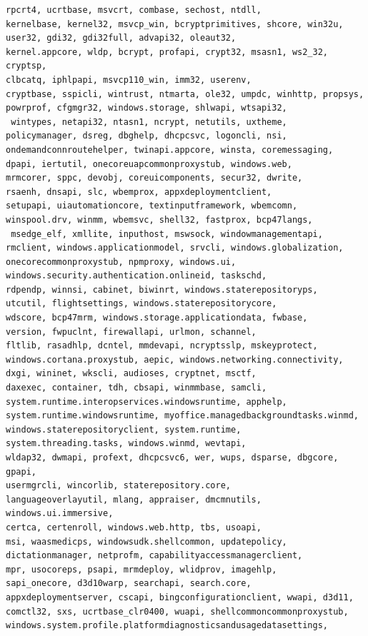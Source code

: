 \documentclass[a4paper,twoside,12pt]{book}
\begin{document}
\begin{appendices}
\begin{lstlisting}[label={lst:dlls},caption={All gathered DLL's},escapeinside=``,basicstyle=\tiny,breaklines=true]
rpcrt4, ucrtbase, msvcrt, combase, sechost, ntdll, 
kernelbase, kernel32, msvcp_win, bcryptprimitives, shcore, win32u, 
user32, gdi32, gdi32full, advapi32, oleaut32, 
kernel.appcore, wldp, bcrypt, profapi, crypt32, msasn1, ws2_32, cryptsp, 
clbcatq, iphlpapi, msvcp110_win, imm32, userenv, 
cryptbase, sspicli, wintrust, ntmarta, ole32, umpdc, winhttp, propsys, 
powrprof, cfgmgr32, windows.storage, shlwapi, wtsapi32,
 wintypes, netapi32, ntasn1, ncrypt, netutils, uxtheme, 
policymanager, dsreg, dbghelp, dhcpcsvc, logoncli, nsi, 
ondemandconnroutehelper, twinapi.appcore, winsta, coremessaging, 
dpapi, iertutil, onecoreuapcommonproxystub, windows.web, 
mrmcorer, sppc, devobj, coreuicomponents, secur32, dwrite, 
rsaenh, dnsapi, slc, wbemprox, appxdeploymentclient, 
setupapi, uiautomationcore, textinputframework, wbemcomn, 
winspool.drv, winmm, wbemsvc, shell32, fastprox, bcp47langs,
 msedge_elf, xmllite, inputhost, mswsock, windowmanagementapi, 
rmclient, windows.applicationmodel, srvcli, windows.globalization, 
onecorecommonproxystub, npmproxy, windows.ui, 
windows.security.authentication.onlineid, taskschd, 
rdpendp, winnsi, cabinet, biwinrt, windows.staterepositoryps, 
utcutil, flightsettings, windows.staterepositorycore, 
wdscore, bcp47mrm, windows.storage.applicationdata, fwbase, 
version, fwpuclnt, firewallapi, urlmon, schannel, 
fltlib, rasadhlp, dcntel, mmdevapi, ncryptsslp, mskeyprotect, 
windows.cortana.proxystub, aepic, windows.networking.connectivity, 
dxgi, wininet, wkscli, audioses, cryptnet, msctf, 
daxexec, container, tdh, cbsapi, winmmbase, samcli, 
system.runtime.interopservices.windowsruntime, apphelp, 
system.runtime.windowsruntime, myoffice.managedbackgroundtasks.winmd, 
windows.staterepositoryclient, system.runtime, 
system.threading.tasks, windows.winmd, wevtapi, 
wldap32, dwmapi, profext, dhcpcsvc6, wer, wups, dsparse, dbgcore, gpapi, 
usermgrcli, wincorlib, staterepository.core, 
languageoverlayutil, mlang, appraiser, dmcmnutils, windows.ui.immersive, 
certca, certenroll, windows.web.http, tbs, usoapi, 
msi, waasmedicps, windowsudk.shellcommon, updatepolicy, 
dictationmanager, netprofm, capabilityaccessmanagerclient, 
mpr, usocoreps, psapi, mrmdeploy, wlidprov, imagehlp, 
sapi_onecore, d3d10warp, searchapi, search.core,
appxdeploymentserver, cscapi, bingconfigurationclient, wwapi, d3d11, 
comctl32, sxs, ucrtbase_clr0400, wuapi, shellcommoncommonproxystub, 
windows.system.profile.platformdiagnosticsandusagedatasettings, 

\end{lstlisting}
\end{appendices}
\end{document}
